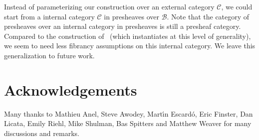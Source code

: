 \documentclass[10pt,a4paper,draft]{article}
\newcommand{\CC}{{\mathcal C}}
\newcommand{\BB}{\mathcal{B}}
\renewcommand{\~}{\widetilde}
\theoremstyle{definition}
\theoremstyle{remark} %
\begin{document}
Instead of parameterizing our construction over an external category $\CC$, we could start from a internal category $\CC$ in presheaves over $\BB$.
Note that the category of presheaves over an internal category in presheaves is still a presheaf category.
Compared to the construction of~\cite{Shulman19} (which instantiates at this level of generality), we seem to need less fibrancy assumptions on this internal category.
We leave this generalization to future work.



\section*{Acknowledgements}

Many thanks to Mathieu Anel, Steve Awodey, Mart\'{\i}n Escard\'{o}, Eric Finster,
Dan Licata, Emily Riehl, Mike Shulman, Bas
Spitters and Matthew Weaver for many discussions and remarks.

\appendix
\end{document}
